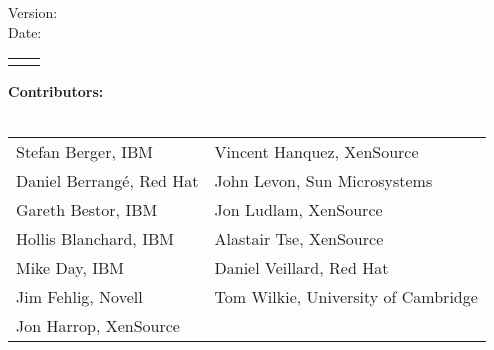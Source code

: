%
%
%
%

\pagestyle{empty}

\doctitle{} \hfill \revstring{}

\vspace{1cm}

\begin{center}

\vspace{2cm}

\begin{Huge}
  \doctitle{}
\end{Huge}

\vspace{1cm}
\begin{Large}
Version: \revstring{}\\
Date: \datestring{}
\\
\releasestatement{}

\vspace{1cm}
\begin{tabular}{rl}
\docauthors{}
\end{tabular}
\end{Large}
\end{center}
\vspace{.5cm}
\begin{large}
\textbf{Contributors:} \\
\\
\begin{tabular}{p{}l}
Stefan Berger, IBM & Vincent Hanquez, XenSource \\
Daniel Berrang\'e, Red Hat & John Levon, Sun Microsystems \\
Gareth Bestor, IBM & Jon Ludlam, XenSource \\
Hollis Blanchard, IBM & Alastair Tse, XenSource \\
Mike Day, IBM & Daniel Veillard, Red Hat \\
Jim Fehlig, Novell & Tom Wilkie, University of Cambridge \\
Jon Harrop, XenSource & \\
\end{tabular}
\end{large}

\vfill

\noindent
\legalnotice{}

\newpage
\pagestyle{fancy}